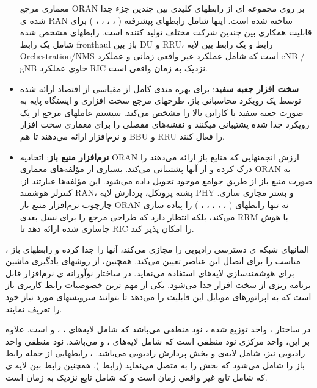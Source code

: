 \begin{itemize}
معماری مرجع ORAN بر روی مجموعه ای از رابطهای کلیدی بین چندین جزء جدا شده ی RAN ساخته شده است.
اینها شامل رابطهای  پیشرفته 
(
،
،
،
،
)
 برای قابلیت همکاری بین چندین شرکت مختلف تولید کننده است.
رابطهای مشخص شده  شامل یک رابط fronthaul باز بین DU و RRU، رابط  و یک رابط  بین لایه 
Orchestration/NMS 
است که شامل عملکرد
 غیر واقعی زمانی  و عملکرد eNB / gNB حاوی عملکرد RIC نزدیک به زمان واقعی 
است.
\item \textbf{سخت افزار جعبه سفید}:
برای بهره مندی کامل از مقیاسی از اقتصاد ارائه شده توسط یک رویکرد  محاسباتی باز،  
طرحهای مرجع 
سخت افزاری و ایستگاه پایه به صورت جعبه سفید با کارایی بالا را مشخص می‌کند. 
سیستم عاملهای مرجع از یک رویکرد جدا شده پشتیبانی میکنند و نقشه‌های مفصلی را برای معماری سخت افزار و نرم‌افزار ارائه می‌دهند تا هم BBU و RRU را فعال کنند. 
\item \textbf{نرم‌افزار منبع باز}:
اتحادیه ORAN ارزش انجمنهایی که منابع باز ارا‌ئه می‌دهند را درک کرده   
 و از آنها پشتیبانی می‌کند.
 بسیاری از مؤلفه‌های معماری ORAN به صورت منبع باز از طریق جوامع موجود تحویل داده می‌شود.
 این مؤلفه‌ها عبارتند از: کنترلر هوشمند RAN، پشته پروتکل، پردازش لایه PHY و بستر مجازی سازی.
  چارچوب نرم‌افزار منبع باز ORAN نه تنها رابطهای 
(
،
،
،
،
،
)
  را پیاده سازی می‌کند، بلکه انتظار دارد که طراحی مرجع را برای نسل بعدی RRM با هوش جاسازی شده ارائه دهد تا RIC را امکان پذیر کند.
\end{itemize}

،
 المانهای شبکه ی دسترسی رادیویی را مجازی می‌کند، آنها را جدا کرده و رابطهای باز مناسب را 
برای اتصال این عناصر
تعیین می‌کند. همچنین، 
از روشهای یادگیری ماشین برای هوشمندسازی لایه‌های 
 استفاده می‌نماید. 
 در ساختار نوآورانه ی 
 نرم‌افزار قابل برنامه ریزی 
 از سخت افزار جدا می‌شود.
  یکی از مهم ترین خصوصیات
  رابط کاربری باز است که به اپراتورهای موبایل این قابلیت را می‌دهد تا بتوانند سرویسهای مورد نیاز خود را تعریف نمایند.

در ساختار
،
واحد توزیع شده ،
نود منطقی می‌باشد که شامل لایه‌های 
،
،
و
است.
علاوه بر این، واحد مرکزی 
نود منطقی است که شامل لایه‌های 
،
و 
می‌باشد.
نود منطقی واحد رادیویی
نیز، شامل لایه‌ی 
و بخش پردازش رادیویی می‌باشد.
،
رابطهایی از جمله رابط 
باز را شامل می‌شود که بخش  را به  متصل می‌نماید
(رابط 
). 
همچنین
 رابط 
 بین لایه ی 
  که شامل 
  تابع غیر واقعی زمان است و 
  که شامل تابع نزدیک به زمان است. 


